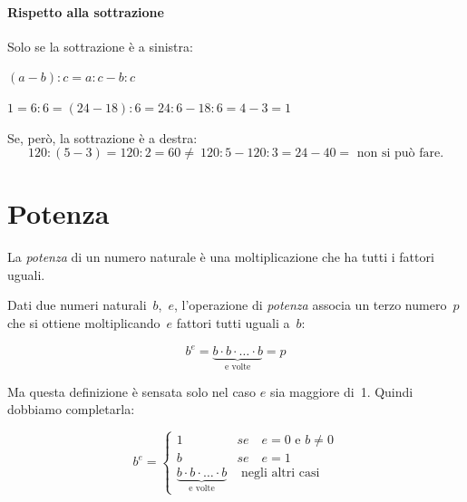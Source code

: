 \paragraph{Rispetto alla sottrazione}
Solo se la sottrazione è a sinistra:

\vspace{.5em}
\begin{minipage}{.38\textwidth}
 \((a-b):c=a:c-b:c\)
\end{minipage}
\hfill
\begin{minipage}{.58\textwidth}
 \(1 = 6 : 6 = (24-18) : 6 = 24 : 6 - 18 : 6 = 4 - 3 = 1\)
\end{minipage}

Se, però, la sottrazione è a destra:
\[120:(5-3)=120:2=60\neq~120:5-120:3=24-40=\text{ non si può fare.}\]


\section{Potenza}
\label{sec:nat_potenza}

La \emph{potenza} di un numero naturale è una moltiplicazione che ha tutti 
i fattori uguali.

\begin{definizione}
Dati due numeri naturali~\(b\),~\(e\), l'operazione di \emph{potenza} 
associa un terzo numero~\(p\) che si ottiene moltiplicando~\(e\) fattori 
tutti 
uguali a~\(b\):
\begin{inaccessibleblock}[
  \[b^e = \mbox{e volte}{b \cdot b \cdot  \dots  \cdot b} = p\]
  ]
\[b^e = \underbrace{b \cdot b \cdot \dots \cdot b}_{\text{e volte}} = p\]
\end{inaccessibleblock}

\end{definizione}

Ma questa definizione è sensata solo nel caso \(e\) sia maggiore di~1.
Quindi dobbiamo completarla:

\begin{inaccessibleblock}[
  \begin{definizione}
    \[
    b^e = \begin{cases}
    1 & se \quad e = 0 \text{ e } b\neq 0\\
    b & se \quad e = 1\\
    \mbox{e volte}{b \cdot b \cdot \dots \cdot b} & \mbox{ 
negli altri casi}
    \end{cases}\]
  \end{definizione}
  ]
  \begin{definizione}
    \[
    b^e = \begin{cases}
    1 & se \quad e = 0 \text{ e } b\neq 0\\
    b & se \quad e = 1\\
    \underbrace{b \cdot b \cdot \dots \cdot b}_{\text{e volte}} & 
\text{ negli altri casi}
    \end{cases}\]
  \end{definizione}
\end{inaccessibleblock}


